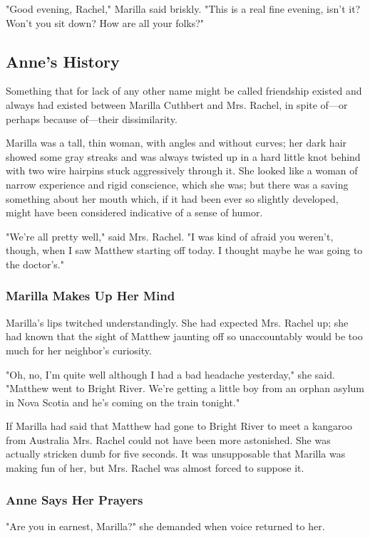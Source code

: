 \documentclass{article}
\begin{document}
"Good evening, Rachel," Marilla said briskly. "This is a real fine evening, isn't it? Won't you sit down? How are all your folks?"

\subsection{Anne's History}
Something that for lack of any other name might be called friendship existed and always had existed between Marilla Cuthbert and Mrs. Rachel, in spite of---or perhaps because of---their dissimilarity.

Marilla was a tall, thin woman, with angles and without curves; her dark hair showed some gray streaks and was always twisted up in a hard little knot behind with two wire hairpins stuck aggressively through it. She looked like a woman of narrow experience and rigid conscience, which she was; but there was a saving something about her mouth which, if it had been ever so slightly developed, might have been considered indicative of a sense of humor.

"We're all pretty well," said Mrs. Rachel. "I was kind of afraid you weren't, though, when I saw Matthew starting off today. I thought maybe he was going to the doctor's."

\subsubsection{Marilla Makes Up Her Mind}
Marilla's lips twitched understandingly. She had expected Mrs. Rachel up; she had known that the sight of Matthew jaunting off so unaccountably would be too much for her neighbor's curiosity.

"Oh, no, I'm quite well although I had a bad headache yesterday," she said. "Matthew went to Bright River. We're getting a little boy from an orphan asylum in Nova Scotia and he's coming on the train tonight."

If Marilla had said that Matthew had gone to Bright River to meet a kangaroo from Australia Mrs. Rachel could not have been more astonished. She was actually stricken dumb for five seconds. It was unsupposable that Marilla was making fun of her, but Mrs. Rachel was almost forced to suppose it.

\subsubsection{Anne Says Her Prayers}
"Are you in earnest, Marilla?" she demanded when voice returned to her.
\end{document}
